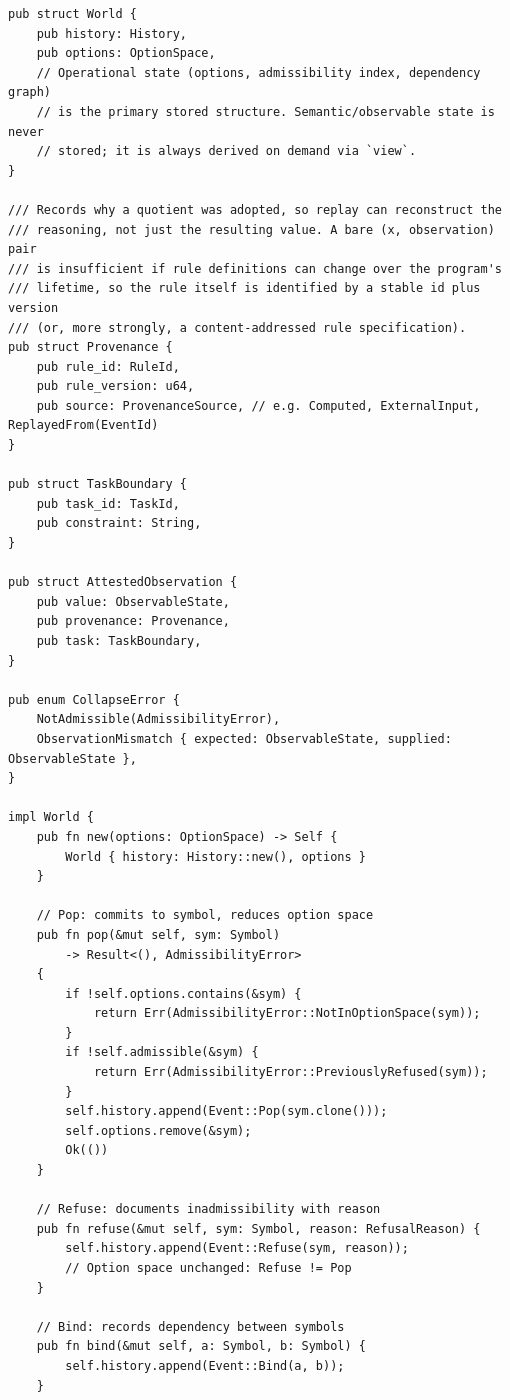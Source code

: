 \documentclass[12pt, a4paper, openany]{book}
\theoremstyle{plain}
\theoremstyle{definition}
\theoremstyle{remark}
\begin{document}
\begin{lstlisting}[style=rust, caption={Complete World structure with view/collapse split}]
pub struct World {
    pub history: History,
    pub options: OptionSpace,
    // Operational state (options, admissibility index, dependency graph)
    // is the primary stored structure. Semantic/observable state is never
    // stored; it is always derived on demand via `view`.
}

/// Records why a quotient was adopted, so replay can reconstruct the
/// reasoning, not just the resulting value. A bare (x, observation) pair
/// is insufficient if rule definitions can change over the program's
/// lifetime, so the rule itself is identified by a stable id plus version
/// (or, more strongly, a content-addressed rule specification).
pub struct Provenance {
    pub rule_id: RuleId,
    pub rule_version: u64,
    pub source: ProvenanceSource, // e.g. Computed, ExternalInput, ReplayedFrom(EventId)
}

pub struct TaskBoundary {
    pub task_id: TaskId,
    pub constraint: String,
}

pub struct AttestedObservation {
    pub value: ObservableState,
    pub provenance: Provenance,
    pub task: TaskBoundary,
}

pub enum CollapseError {
    NotAdmissible(AdmissibilityError),
    ObservationMismatch { expected: ObservableState, supplied: ObservableState },
}

impl World {
    pub fn new(options: OptionSpace) -> Self {
        World { history: History::new(), options }
    }

    // Pop: commits to symbol, reduces option space
    pub fn pop(&mut self, sym: Symbol)
        -> Result<(), AdmissibilityError>
    {
        if !self.options.contains(&sym) {
            return Err(AdmissibilityError::NotInOptionSpace(sym));
        }
        if !self.admissible(&sym) {
            return Err(AdmissibilityError::PreviouslyRefused(sym));
        }
        self.history.append(Event::Pop(sym.clone()));
        self.options.remove(&sym);
        Ok(())
    }

    // Refuse: documents inadmissibility with reason
    pub fn refuse(&mut self, sym: Symbol, reason: RefusalReason) {
        self.history.append(Event::Refuse(sym, reason));
        // Option space unchanged: Refuse != Pop
    }

    // Bind: records dependency between symbols
    pub fn bind(&mut self, a: Symbol, b: Symbol) {
        self.history.append(Event::Bind(a, b));
    }


\end{lstlisting}
\end{document}
